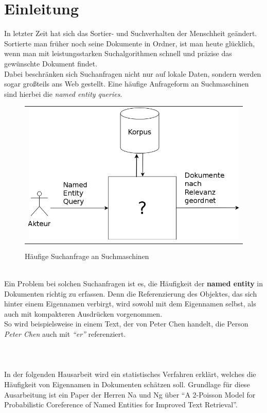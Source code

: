 \section{Einleitung}
In letzter Zeit hat sich das Sortier- und Suchverhalten der Menschheit geändert. Sortierte man früher noch seine Dokumente in Ordner, ist man heute glücklich, wenn man mit leistungsstarken Suchalgorithmen schnell und präzise das gewünschte Dokument findet.\\
Dabei beschränken sich Suchanfragen nicht nur auf lokale Daten, sondern werden sogar großteils ans Web gestellt. Eine häufige Anfrageform an Suchmaschinen sind hierbei die \textit{named entity queries}\cite{paper:Guha}.\\
\begin{figure}[h]
	\centering
	\begin{tabular}{c}
		\includegraphics[scale=.2]{pics/overview}
	\end{tabular}
	\caption{Häufige Suchanfrage an Suchmaschinen}
	\label{tab:freq_query}
\end{figure}\\
Ein Problem bei solchen Suchanfragen ist es, die Häufigkeit der \textbf{named entity} in Dokumenten richtig zu erfassen\cite{paper:Na}.
Denn die Referenzierung des Objektes, das sich hinter einem Eigennamen verbirgt, wird sowohl mit dem Eigennamen selbst, als auch mit kompakteren Ausdrücken vorgenommen.\\
So wird beispielsweise in einem Text, der von Peter Chen handelt, die Person \textit{Peter Chen} auch mit \textit{"`er"'} referenziert.\\
\\
\\
\\
In der folgenden Hausarbeit wird ein statistisches Verfahren erklärt, welches die Häufigkeit von Eigennamen in Dokumenten schätzen soll. Grundlage für diese Ausarbeitung ist ein Paper der Herren Na und Ng über "`A 2-Poisson Model for Probabilistic Coreference of Named Entities for Improved Text Retrieval"'\cite{paper:Na}.

